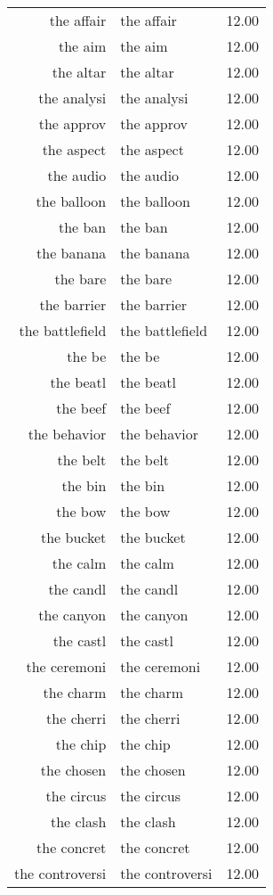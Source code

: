\begin{table}[ht]
\begin{tabular}{rlr}
  the affair & the affair & 12.00 \\ 
  the aim & the aim & 12.00 \\ 
  the altar & the altar & 12.00 \\ 
  the analysi & the analysi & 12.00 \\ 
  the approv & the approv & 12.00 \\ 
  the aspect & the aspect & 12.00 \\ 
  the audio & the audio & 12.00 \\ 
  the balloon & the balloon & 12.00 \\ 
  the ban & the ban & 12.00 \\ 
  the banana & the banana & 12.00 \\ 
  the bare & the bare & 12.00 \\ 
  the barrier & the barrier & 12.00 \\ 
  the battlefield & the battlefield & 12.00 \\ 
  the be & the be & 12.00 \\ 
  the beatl & the beatl & 12.00 \\ 
  the beef & the beef & 12.00 \\ 
  the behavior & the behavior & 12.00 \\ 
  the belt & the belt & 12.00 \\ 
  the bin & the bin & 12.00 \\ 
  the bow & the bow & 12.00 \\ 
  the bucket & the bucket & 12.00 \\ 
  the calm & the calm & 12.00 \\ 
  the candl & the candl & 12.00 \\ 
  the canyon & the canyon & 12.00 \\ 
  the castl & the castl & 12.00 \\ 
  the ceremoni & the ceremoni & 12.00 \\ 
  the charm & the charm & 12.00 \\ 
  the cherri & the cherri & 12.00 \\ 
  the chip & the chip & 12.00 \\ 
  the chosen & the chosen & 12.00 \\ 
  the circus & the circus & 12.00 \\ 
  the clash & the clash & 12.00 \\ 
  the concret & the concret & 12.00 \\ 
  the controversi & the controversi & 12.00 \\ 

\end{tabular}
\end{table}
